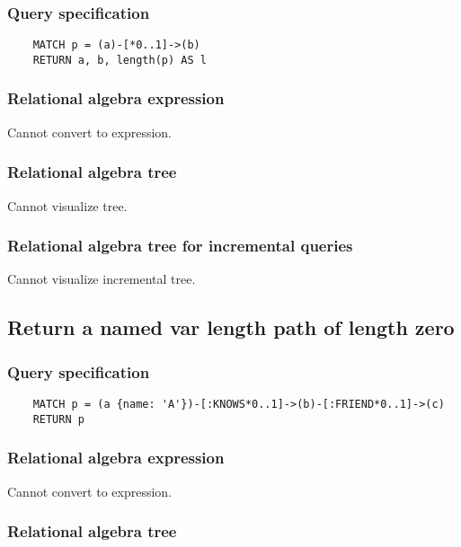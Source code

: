 	\subsubsection*{Query specification}

	\begin{lstlisting}
	MATCH p = (a)-[*0..1]->(b)
	RETURN a, b, length(p) AS l
	\end{lstlisting}


	\subsubsection*{Relational algebra expression}

	Cannot convert to expression.

	\subsubsection*{Relational algebra tree}

	Cannot visualize tree.

	\subsubsection*{Relational algebra tree for incremental queries}

	Cannot visualize incremental tree.
	\subsection{Return a named var length path of length zero}

	\subsubsection*{Query specification}

	\begin{lstlisting}
	MATCH p = (a {name: 'A'})-[:KNOWS*0..1]->(b)-[:FRIEND*0..1]->(c)
	RETURN p
	\end{lstlisting}


	\subsubsection*{Relational algebra expression}

	Cannot convert to expression.

	\subsubsection*{Relational algebra tree}

